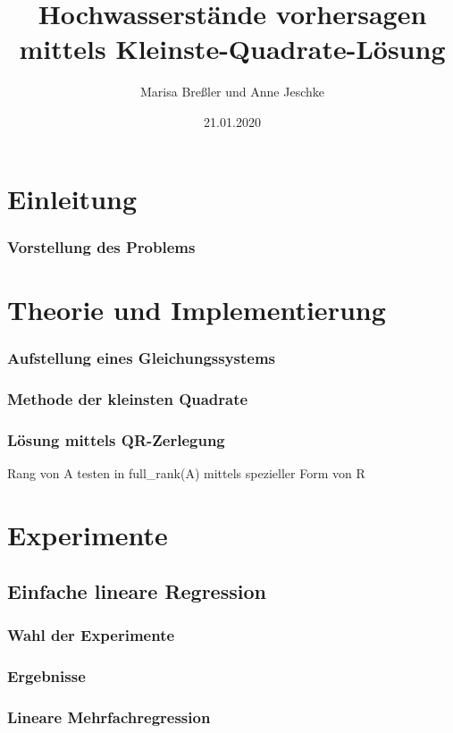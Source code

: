 \documentclass{beamer}
\title{Hochwasserstände vorhersagen mittels Kleinste-Quadrate-Lösung}
\author{Marisa Breßler und Anne Jeschke}
\date{21.01.2020}
\begin{document}
\maketitle
\frame{\tableofcontents[currentsection]}

\section{Einleitung}
\begin{frame} %
  \frametitle{Vorstellung des Problems} %
    \begin{table}

    \end{table}
\end{frame}

\section{Theorie und Implementierung}
\begin{frame} %
  \frametitle{Aufstellung eines Gleichungssystems} %

\end{frame}

\begin{frame} %
  \frametitle{Methode der kleinsten Quadrate} %

\end{frame}

\begin{frame} %
  \frametitle{Lösung mittels QR-Zerlegung} %
   Rang von A testen in full\_rank(A) mittels spezieller Form von R
\end{frame}

\section{Experimente}
\subsection{Einfache lineare Regression}

\begin{frame} %
  \frametitle{Wahl der Experimente} %

\end{frame}

\begin{frame} %
  \frametitle{Ergebnisse} %

\end{frame}

\begin{frame} %
  \frametitle{Lineare Mehrfachregression} %

\end{frame}
\end{document}
